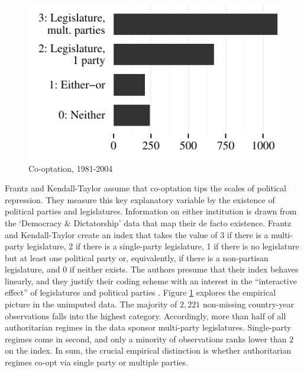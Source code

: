 \begin{figure}
\centering
\includegraphics[width=\linewidth]{./sections/02data/barCooptation.pdf}
\caption{Co-optation, 1981-2004}
\label{fig:barCooptation}
\end{figure}
Frantz and Kendall-Taylor assume that co-optation tips the 
scales of political repression. They measure this key 
explanatory variable by the existence of political parties 
and legislatures. Information on either institution is drawn 
from the `Democracy \& Dictatorship' data 
\citep{Cheibub.2010} that map their de facto existence. 
Frantz and Kendall-Taylor create an index that takes the 
value of 3 if there is a multi-party legislature, 
2 if there is a single-party legislature, 1 if there is no 
legislature but at least one political party or, 
equivalently, if there is a non-partisan legislature, and 0 
if neither exists. The authors presume that their index 
behaves linearly, and they justify their coding scheme with 
an interest in the ``interactive effect'' of legislatures 
and political parties \citep[338]{Frantz.2014}. Figure 
\ref{fig:barCooptation} explores the empirical picture in 
the unimputed data. The majority of $2,221$ non-missing 
country-year observations falls into the highest category. 
Accordingly, more than half of all authoritarian regimes in 
the data sponsor multi-party legislatures. Single-party 
regimes come in second, and only a minority of observations 
ranks lower than $2$ on the index. In sum, the crucial 
empirical distinction is whether authoritarian regimes 
co-opt via single party or multiple parties.